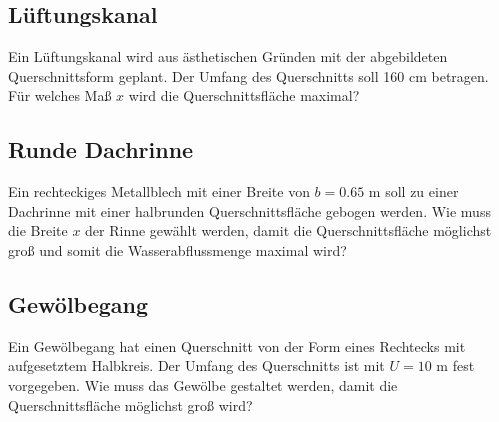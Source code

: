 
\subsection{Lüftungskanal}
Ein Lüftungskanal wird aus ästhetischen
Gründen mit der abgebildeten Querschnittsform
geplant. Der Umfang des Querschnitts soll
160 cm betragen.
Für welches Maß $x$ wird die Querschnittsfläche
maximal?


\subsection{Runde Dachrinne}
Ein rechteckiges Metallblech mit einer Breite
von $b = 0.65 \text{ m}$ soll zu einer Dachrinne mit einer
halbrunden Querschnittsfläche gebogen werden.
Wie muss die Breite $x$ der Rinne gewählt werden,
damit die Querschnittsfläche möglichst groß und somit
die Wasserabflussmenge maximal wird?




\subsection{Gewölbegang}

Ein Gewölbegang hat einen Querschnitt
von der Form eines Rechtecks mit aufgesetztem Halbkreis. Der Umfang
des Querschnitts ist mit $U=10 \text{ m}$ fest vorgegeben.
Wie muss das Gewölbe gestaltet werden, damit die Querschnittsfläche
möglichst groß wird?


\newpage
